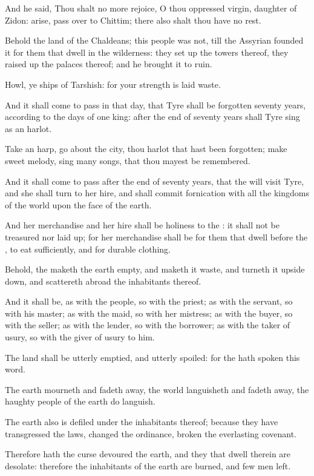 \Verse And he said, Thou shalt no more rejoice, O thou oppressed virgin, daughter of Zidon: arise, pass over to Chittim; there also shalt thou have no rest.

\Verse Behold the land of the Chaldeans; this people was not, till the Assyrian founded it for them that dwell in the wilderness: they set up the towers thereof, they raised up the palaces thereof; and he brought it to ruin.

\Verse Howl, ye ships of Tarshish: for your strength is laid waste.

\Verse And it shall come to pass in that day, that Tyre shall be forgotten seventy years, according to the days of one king: after the end of seventy years shall Tyre sing as an harlot.

\Verse Take an harp, go about the city, thou harlot that hast been forgotten; make sweet melody, sing many songs, that thou mayest be remembered.

\Verse And it shall come to pass after the end of seventy years, that the \LORD will visit Tyre, and she shall turn to her hire, and shall commit fornication with all the kingdoms of the world upon the face of the earth.

\Verse And her merchandise and her hire shall be holiness to the \LORD: it shall not be treasured nor laid up; for her merchandise shall be for them that dwell before the \LORD, to eat sufficiently, and for durable clothing.


\Chapter
\Verse Behold, the \LORD maketh the earth empty, and maketh it waste, and turneth it upside down, and scattereth abroad the inhabitants thereof.

\Verse And it shall be, as with the people, so with the priest; as with the servant, so with his master; as with the maid, so with her mistress; as with the buyer, so with the seller; as with the lender, so with the borrower; as with the taker of usury, so with the giver of usury to him.

\Verse The land shall be utterly emptied, and utterly spoiled: for the \LORD hath spoken this word.

\Verse The earth mourneth and fadeth away, the world languisheth and fadeth away, the haughty people of the earth do languish.

\Verse The earth also is defiled under the inhabitants thereof; because they have transgressed the laws, changed the ordinance, broken the everlasting covenant.

\Verse Therefore hath the curse devoured the earth, and they that dwell therein are desolate: therefore the inhabitants of the earth are burned, and few men left.

